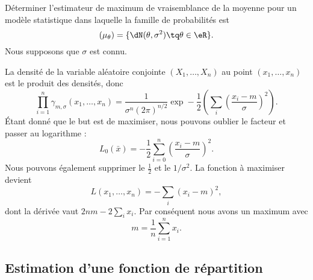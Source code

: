 \begin{example}

	Déterminer l'estimateur de maximum de vraisemblance de la moyenne pour un modèle statistique dans laquelle la famille de probabilités est
	\begin{equation}
		(\mu_{\theta})=\{ \dN(\theta,\sigma^2)\tq \theta\in\eR \}.
	\end{equation}
	Nous supposons que \( \sigma\) est connu.

	La densité de la variable aléatoire conjointe \( (X_1,\ldots,X_n)\) au point \( (x_1,\ldots,x_n)\) est le produit des densités, donc
	\begin{equation}
		\prod_{i=1}^n\gamma_{m,\sigma}(x_1,\ldots,x_n)=\frac{1}{ \sigma^n(2\pi)^{n/2} }\exp-\frac{ 1 }{2}\left( \sum_i\left( \frac{ x_i-m }{ \sigma } \right)^2 \right).
	\end{equation}
	Étant donné que le but est de maximiser, nous pouvons oublier le facteur et passer au logarithme :
	\begin{equation}
		L_0(\bar x)=-\frac{ 1 }{2}\sum_{i=0}^n\left( \frac{ x_i-m }{ \sigma } \right)^2.
	\end{equation}
	Nous pouvons également supprimer le \( \frac{ 1 }{2}\) et le \( 1/\sigma^2\). La fonction à maximiser devient
	\begin{equation}
		L(x_1,\ldots,x_n)=-\sum_i(x_i-m)^2,
	\end{equation}
	dont la dérivée vaut \( 2nm-2\sum_ix_i\). Par conséquent nous avons un maximum avec
	\begin{equation}
		m=\frac{1}{ n }\sum_{i=1}^nx_i.
	\end{equation}
\end{example}

\subsection{Estimation d'une fonction de répartition}

